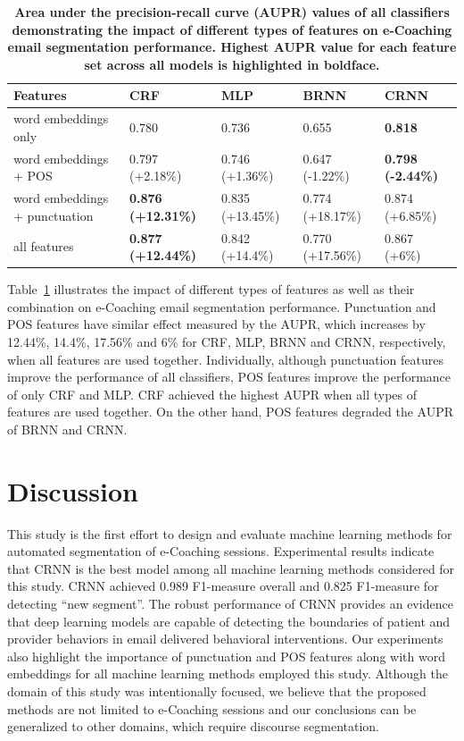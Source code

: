 \documentclass{amia}
\begin{document}
\begin{table}[ht]
\centering
\caption{\textbf{Area under the precision-recall curve (AUPR) values of all classifiers demonstrating the impact of different types of features on e-Coaching email segmentation performance. Highest AUPR value for each feature set across all models is highlighted in boldface.}}
\label{tab:result_aupr}
 \begin{tabular}{|l|l|l|l|l|}
  \hline
\textbf{Features} & \textbf{CRF} & \textbf{MLP}  & \textbf{BRNN} & \textbf{CRNN} \\ \hline      
 word embeddings only & 0.780 & 0.736 & 0.655 & \textbf{0.818} \\ \hline
 word embeddings + POS & 0.797 (+2.18\%) & 0.746 (+1.36\%) & 0.647 (-1.22\%) & \textbf{0.798 (-2.44\%)} \\ \hline
 word embeddings + punctuation & \textbf{0.876 (+12.31\%)} & 0.835 (+13.45\%) & 0.774 (+18.17\%) & 0.874 (+6.85\%) \\ \hline
 all features & \textbf{0.877 (+12.44\%)} & 0.842 (+14.4\%) & 0.770 (+17.56\%) & 0.867 (+6\%) \\ \hline
  \end{tabular}
\end{table}     

Table~\ref{tab:result_aupr} illustrates the impact of different types of features as well as their combination on e-Coaching email segmentation performance. Punctuation and POS features have similar effect measured by the AUPR, which increases by 12.44\%, 14.4\%, 17.56\% and 6\% for CRF, MLP, BRNN and CRNN, respectively, when all features are used together. Individually, although punctuation features improve the performance of all classifiers, POS features improve the performance of only CRF and MLP. CRF achieved the highest AUPR when all types of features are used together. On the other hand, POS features degraded the AUPR of BRNN and CRNN.

\section*{Discussion}
This study is the first effort to design and evaluate machine learning methods for automated segmentation of e-Coaching sessions. Experimental results indicate that CRNN is the best model among all machine learning methods considered for this study. CRNN achieved 0.989 F1-measure overall and 0.825 F1-measure for detecting ``new segment''. The robust performance of CRNN provides an evidence that deep learning models are capable of detecting the boundaries of patient and provider behaviors in email delivered behavioral interventions. Our experiments also highlight the importance of punctuation and POS features along with word embeddings for all machine learning methods employed this study. Although the domain of this study was intentionally focused, we believe that the proposed methods are not limited to e-Coaching sessions and our conclusions can be generalized to other domains, which require discourse segmentation.
\end{document}

